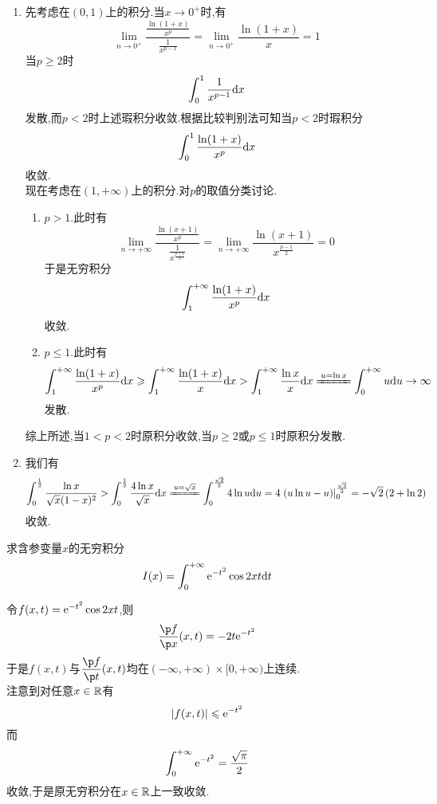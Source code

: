 \documentclass{ctexart}
\begin{document}
\begin{solution}
    \begin{enumerate}[label=\tbf{(\arabic*)},topsep=0pt,parsep=0pt,itemsep=0pt,partopsep=0pt]
        \item 先考虑在$(0,1)$上的积分.当$x\to0^+$时,有
            \[\lim_{n\to0^+}\dfrac{\frac{\ln(1+x)}{x^p}}{\frac{1}{x^{p-1}}}
            =\lim_{n\to0^+}\dfrac{\ln(1+x)}{x}=1\]
            当$p\geqslant 2$时
            \[\int_0^1\dfrac{1}{x^{p-1}}\mathrm{d} x\]
            发散,而$p<2$时上述瑕积分收敛.根据比较判别法可知当$p<2$时瑕积分
            \[\int_0^1\dfrac{\ln(1+x)}{x^p}\mathrm{d} x\]
            收敛.\\
            现在考虑在$(1,+\infty)$上的积分.对$p$的取值分类讨论.
            \begin{enumerate}[label=\tbf{\roman*.},topsep=0pt,parsep=0pt,itemsep=0pt,partopsep=0pt,leftmargin=*]
                \item $p>1$.此时有
                    \[\lim_{n\to+\infty}\dfrac{\frac{\ln(x+1)}{x^p}}{\frac{1}{x^{\frac{p+1}{2}}}}
                    =\lim_{n\to+\infty}\dfrac{\ln(x+1)}{x^{\frac{p-1}{2}}}=0\]
                    于是无穷积分
                    \[\int_1^{+\infty}\dfrac{\ln(1+x)}{x^p}\mathrm{d} x\]
                    收敛.
                \item $p\leqslant1$.此时有
                    \[\int_1^{+\infty}\dfrac{\ln(1+x)}{x^p}\di x
                    \geqslant\int_1^{+\infty}\dfrac{\ln(1+x)}{x}\di x
                    >\int_1^{+\infty}\dfrac{\ln x}{x}\di x
                    \xlongequal{u=\ln x}\int_0^{+\infty}u\di u\to\infty\]
                    发散.
            \end{enumerate}
            综上所述,当$1<p<2$时原积分收敛,当$p\geqslant 2$或$p\leqslant 1$时原积分发散.
        \item 我们有
            \[\int_0^{\frac12}\dfrac{\ln x}{\sqrt{x}(1-x)^2}
            >\int_0^{\frac12}\dfrac{4\ln x}{\sqrt{x}}\di x
            \xlongequal{u=\sqrt{x}}\int_0^{\frac{\sqrt2}{2}}4\ln u\di u
            =4\left.\left(u\ln u-u\right)\right|_0^{\frac{\sqrt{2}}{2}}=-\sqrt{2}\left(2+\ln 2\right)\]
            收敛.
    \end{enumerate}
\end{solution}
\begin{problem}[7.(10\songti{分})]
    求含参变量$x$的无穷积分
    \[I(x)=\int_0^{+\infty}\mathrm{e}^{-t^2}\cos 2xt\mathrm{d} t\]
     
\end{problem}
\begin{solution}
    令$f(x,t)=\mathrm{e}^{-t^2}\cos 2xt$,则
    \[\dfrac{\p f}{\p x}(x,t)=-2t\e^{-t^2}\]
    于是$f(x,t)$与$\dfrac{\p f}{\p t}(x,t)$均在$(-\infty,+\infty)\times[0,+\infty)$上连续.\\
    注意到对任意$x\in\mathbb{R}$有
    \[\left|f(x,t)\right|\leqslant \mathrm{e}^{-t^2}\]
    而
    \[\int_0^{+\infty}\mathrm{e}^{-t^2}=\dfrac{\sqrt{\pi}}{2}\]
    收敛,于是原无穷积分在$x\in\mathbb{R}$上一致收敛.
\end{solution}
\end{document}
